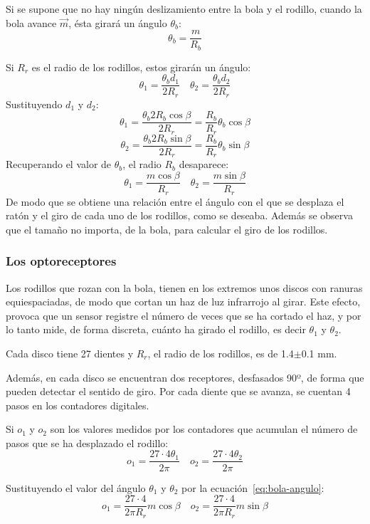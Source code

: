 \documentclass[10pt,a4paper,hidelinks,twocolumn,nobalancelastpage]{article}
\begin{document}
Si se supone que no hay ningún deslizamiento entre la bola y el rodillo, cuando 
la bola avance $\vec{m}$, ésta girará un ángulo $\theta_b$:
$$ \theta_b = \frac{m}{R_b} $$

Si $R_r$ es el radio de los rodillos, estos girarán un ángulo:
$$ \theta_1 = \frac{\theta_b d_1}{2R_r} \quad
	\theta_2 = \frac{\theta_b d_2}{2R_r}$$
Sustituyendo $d_1$ y $d_2$:
$$ \theta_1 = \frac{\theta_b 2R_b\cos \beta}{2R_r} =
	\frac{R_b}{R_r}\theta_b\cos \beta$$
$$ \theta_2 = \frac{\theta_b 2R_b\sin \beta}{2R_r} =
	\frac{R_b}{R_r}\theta_b\sin \beta$$
Recuperando el valor de $\theta_b$, el radio $R_b$ desaparece:
\begin{equation}
\theta_1 = \frac{m \cos \beta}{R_r} \quad
\theta_2 = \frac{m \sin \beta}{R_r} \label{eq:bola-angulo}
\end{equation}
De modo que se obtiene una relación entre el ángulo con el que se desplaza el 
ratón y el giro de cada uno de los rodillos, como se deseaba. Además se observa 
que el tamaño no importa, de la bola, para calcular el giro de los rodillos.
\subsubsection{Los optoreceptores}

Los rodillos que rozan con la bola, tienen en los extremos unos discos con
ranuras equiespaciadas, de modo que cortan un haz de luz infrarrojo al girar.  
Este efecto, provoca que un sensor registre el número de veces que se ha cortado 
el haz, y por lo tanto mide, de forma discreta, cuánto ha girado el rodillo, es 
decir $\theta_1$ y $\theta_2$.


Cada disco tiene 27 dientes y $R_r$, el radio de los rodillos, es de 
1.4$\pm$0.1 mm.

Además, en cada disco se encuentran dos receptores, desfasados 90º, de forma que 
pueden detectar el sentido de giro. Por cada diente que se avanza, se cuentan 4 
pasos en los contadores digitales.

Si $o_1$ y $o_2$ son los valores medidos por los contadores que acumulan el 
número de pasos que se ha desplazado el rodillo:
$$o_1 = \frac{27 \cdot 4 \theta_1}{2\pi} \quad 
o_2 = \frac{27 \cdot 4 \theta_2}{2\pi}$$

Sustituyendo el valor del ángulo $\theta_1$ y $\theta_2$ por la 
ecuación~\ref{eq:bola-angulo}:
$$ o_1 = \frac{27\cdot4}{2 \pi R_r} m \cos \beta \quad
	o_2 = \frac{27\cdot4}{2 \pi R_r} m \sin \beta $$
\end{document}
